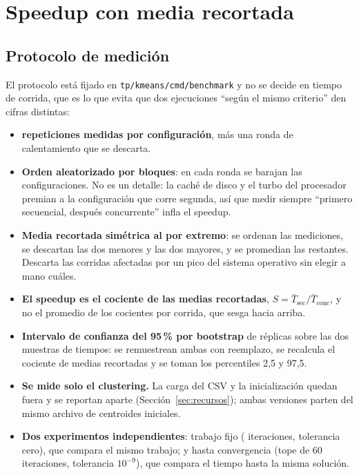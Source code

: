 \section{Speedup con media recortada}\label{sec:speedup}

\subsection{Protocolo de medición}

El protocolo está fijado en \texttt{tp/kmeans/cmd/benchmark} y no se decide en tiempo de corrida,
que es lo que evita que dos ejecuciones \enquote{según el mismo criterio} den cifras distintas:

\begin{itemize}
  \item \textbf{ repeticiones medidas por configuración}, más una ronda de
        calentamiento que se descarta.
  \item \textbf{Orden aleatorizado por bloques}: en cada ronda se barajan las configuraciones. No es
        un detalle: la caché de disco y el turbo del procesador premian a la configuración que corre
        segunda, así que medir siempre \enquote{primero secuencial, después concurrente} infla el
        speedup.
  \item \textbf{Media recortada simétrica al  por extremo}: se ordenan las
         mediciones, se descartan las dos menores y las dos mayores, y se
        promedian las restantes. Descarta las corridas afectadas por un pico del sistema operativo
        sin elegir a mano cuáles.
  \item \textbf{El speedup es el cociente de las medias recortadas},
        $S = \bar{T}_{\text{sec}} / \bar{T}_{\text{conc}}$, y no el promedio de los cocientes por
        corrida, que sesga hacia arriba.
  \item \textbf{Intervalo de confianza del 95\,\% por bootstrap} de  réplicas
        sobre las dos muestras de tiempos: se remuestrean ambas con reemplazo, se recalcula el
        cociente de medias recortadas y se toman los percentiles 2,5 y 97,5.
  \item \textbf{Se mide solo el clustering.} La carga del CSV y la inicialización quedan fuera y se
        reportan aparte (Sección~\ref{sec:recursos}); ambas versiones parten del mismo archivo de
        centroides iniciales.
  \item \textbf{Dos experimentos independientes}: trabajo fijo ( iteraciones,
        tolerancia cero), que compara el mismo trabajo; y hasta convergencia (tope de 60
        iteraciones, tolerancia $10^{-9}$), que compara el tiempo hasta la misma solución.
\end{itemize}

